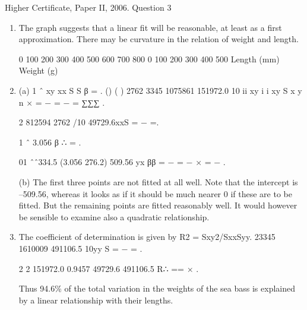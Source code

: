 \documentclass[a4paper,12pt]{article}
\begin{document}
Higher Certificate, Paper II, 2006.  Question 3 
 
\begin{enumerate} 
\item  The graph suggests that a linear fit will be reasonable, at least as a first approximation.  There may be curvature in the relation of weight and length. 
 
 
0
100
200
300
400
500
600
700
800
0 100 200 300 400 500 Length (mm)
Weight (g)
 
 
\item  (a) 1 ˆ xy xx S S β = . 
() ( ) 2762 3345 1075861 151972.0 10 ii
xy i i
xy
S x y
n
× = − = − = ∑∑∑ . 
 
2 812594 2762 /10 49729.6xxS = − =. 
 
1 ˆ 3.056 β ∴ = . 
 
01 ˆˆ334.5 (3.056 276.2) 509.56 yx ββ = − = − × = − . 
 
 
 (b) The first three points are not fitted at all well.  Note that the intercept is –509.56, whereas it looks as if it should be much nearer 0 if these are to be fitted.  But the remaining points are fitted reasonably well.  It would however be sensible to examine also a quadratic relationship. 
 
 
\item  The coefficient of determination is given by R2 = Sxy2/SxxSyy. 
 23345 1610009 491106.5 10yy S = − = . 
 
2 2 151972.0 0.9457 49729.6 491106.5 R∴ == × . 
 
Thus 94.6\% of the total variation in the weights of the sea bass is explained by a linear relationship with their lengths. 
\end{enumerate}
\end{document}
